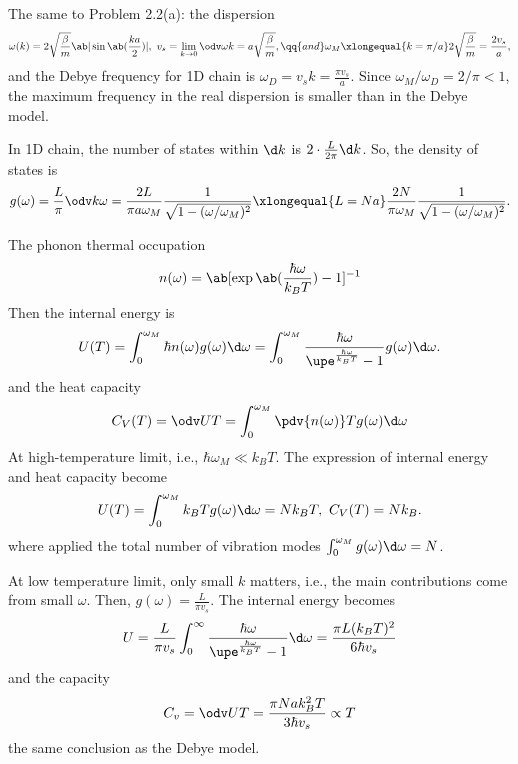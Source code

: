 \begin{solution}\leavevmode
  \begin{enumext}[label = (\alph*)]
    \item The same to Problem 2.2(a): the dispersion
    \[
      \omega(k) = 2\sqrt{\frac\beta m}\ab|\sin\ab(\frac{ka}{2})|, ~
      v_s = \lim_{k\to0}\odv\omega k = a\sqrt{\frac\beta m}, \qq{and}
      \omega_M \xlongequal{k=\pi/a} 2\sqrt{\frac\beta m} = \frac{2v_s}{a},
    \]
    and the Debye frequency for 1D chain is $\omega_D = v_s k = \frac{\pi v_s}{a}$.
    Since $\omega_M/\omega_D = 2/\pi < 1$,
    the maximum frequency in the real dispersion is smaller than in the Debye model.
    \item In 1D chain, the number of states within $\d k$ is $2 \cdot \frac{L}{2\pi} \d k$. So, the density of states is
    \[
      g(\omega) = \frac L\pi \odv k\omega
    = \frac{2L}{\pi a\omega_M} \frac1{\sqrt{1 - (\omega/\omega_M)^2}}
    \xlongequal{L = Na} \frac{2N}{\pi\omega_M}
    \frac1{\sqrt{1 - (\omega/\omega_M)^2}}.
    \]
    \item The phonon thermal occupation
    \[
      n(\omega) = \ab[\exp\ab(\frac{\hbar\omega}{k_BT}) - 1]^{-1}
    \]
    Then the internal energy is
    \[
      U(T) = \int_0^{\omega_M} \hbar n(\omega) g(\omega) \d\omega
    = \int_0^{\omega_M} \frac{\hbar\omega}{\upe^{\frac{\hbar\omega}{k_BT}} - 1} g(\omega) \d\omega.
    \]
    and the heat capacity
    \[
      C_V(T) = \odv UT = \int_0^{\omega_M} \pdv{n(\omega)}T g(\omega) \d\omega
    \]
    At high-temperature limit, i.e., $\hbar\omega_M \ll k_BT$. The expression of internal energy and heat capacity become
    \[
      U(T) = \int_0^{\omega_M} k_BT g(\omega) \d\omega = Nk_BT,~
      C_V(T) = Nk_B.
    \]
    where applied the total number of vibration modes
    $\int_0^{\omega_M} g(\omega) \d\omega = N$.
    \newpage
    \item At low temperature limit, only small $k$ matters, i.e., the main contributions come from small $\omega$. Then, $g(\omega) = \frac L{\pi v_s}$.
    The internal energy becomes
    \[
      U = \frac L{\pi v_s} \int_0^\infty \frac{\hbar\omega}{\upe^{\frac{\hbar\omega}{k_BT}} - 1} \d\omega = \frac{\pi L(k_BT)^2}{6\hbar v_s}
    \]
    and the capacity
    \[
      C_v = \odv UT = \frac{\pi Nak_B^2T}{3\hbar v_s} \propto T
    \]
    the same conclusion as the Debye model.
  \end{enumext}
\end{solution}